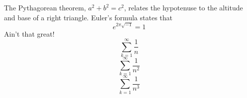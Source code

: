 The Pythagorean theorem, $a^2 + b^2 = c^2$,
relates the hypotenuse to the altitude
and base of a right triangle.
Euler’s formula states that
\[
e^{2\pi \sqrt{-1}} = 1
\]
Ain’t that great!
\begin{equation*}
\sum_{k=1}^\infty \frac{1}{n}
\end{equation*}
\begin{equation}
\label{hoho}
\sum_{k=1}^\infty \frac{1}{n^2}
\end{equation}
\begin{equation}
\sum_{k=1}^\infty \frac{1}{n^3}
\end{equation}
